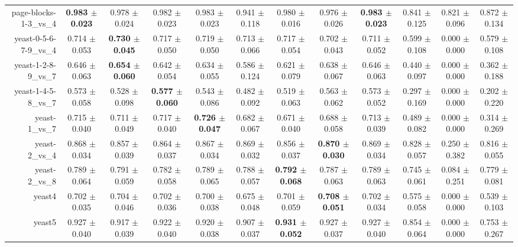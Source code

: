 \begin{table}[!ht]
{\begin{tabular}{r c c c c c c c c c c c}
page-blocks-1-3\_vs\_4 & \textbf{0.983 $\pm$ 0.023} & 0.978 $\pm$ 0.024 & 0.982 $\pm$ 0.023 & 0.983 $\pm$ 0.023 & 0.941 $\pm$ 0.118 & 0.980 $\pm$ 0.016 & 0.976 $\pm$ 0.026 & \textbf{0.983 $\pm$ 0.023} & 0.841 $\pm$ 0.125 & 0.821 $\pm$ 0.096 & 0.872 $\pm$ 0.134 \\
yeast-0-5-6-7-9\_vs\_4 & 0.714 $\pm$ 0.053 & \textbf{0.730 $\pm$ 0.045} & 0.717 $\pm$ 0.050 & 0.719 $\pm$ 0.050 & 0.713 $\pm$ 0.066 & 0.717 $\pm$ 0.054 & 0.702 $\pm$ 0.043 & 0.711 $\pm$ 0.052 & 0.599 $\pm$ 0.108 & 0.000 $\pm$ 0.000 & 0.579 $\pm$ 0.108 \\
yeast-1-2-8-9\_vs\_7 & 0.646 $\pm$ 0.063 & \textbf{0.654 $\pm$ 0.060} & 0.642 $\pm$ 0.054 & 0.634 $\pm$ 0.055 & 0.586 $\pm$ 0.124 & 0.621 $\pm$ 0.079 & 0.638 $\pm$ 0.067 & 0.646 $\pm$ 0.063 & 0.440 $\pm$ 0.097 & 0.000 $\pm$ 0.000 & 0.362 $\pm$ 0.188 \\
yeast-1-4-5-8\_vs\_7 & 0.573 $\pm$ 0.058 & 0.528 $\pm$ 0.098 & \textbf{0.577 $\pm$ 0.060} & 0.543 $\pm$ 0.086 & 0.482 $\pm$ 0.092 & 0.519 $\pm$ 0.063 & 0.563 $\pm$ 0.062 & 0.573 $\pm$ 0.052 & 0.297 $\pm$ 0.169 & 0.000 $\pm$ 0.000 & 0.202 $\pm$ 0.220 \\
yeast-1\_vs\_7 & 0.715 $\pm$ 0.040 & 0.711 $\pm$ 0.049 & 0.717 $\pm$ 0.040 & \textbf{0.726 $\pm$ 0.047} & 0.682 $\pm$ 0.067 & 0.671 $\pm$ 0.040 & 0.688 $\pm$ 0.058 & 0.713 $\pm$ 0.039 & 0.489 $\pm$ 0.082 & 0.000 $\pm$ 0.000 & 0.314 $\pm$ 0.269 \\
yeast-2\_vs\_4 & 0.868 $\pm$ 0.034 & 0.857 $\pm$ 0.039 & 0.864 $\pm$ 0.037 & 0.867 $\pm$ 0.034 & 0.869 $\pm$ 0.032 & 0.856 $\pm$ 0.037 & \textbf{0.870 $\pm$ 0.030} & 0.869 $\pm$ 0.034 & 0.828 $\pm$ 0.057 & 0.250 $\pm$ 0.382 & 0.816 $\pm$ 0.055 \\
yeast-2\_vs\_8 & 0.789 $\pm$ 0.064 & 0.791 $\pm$ 0.059 & 0.782 $\pm$ 0.058 & 0.789 $\pm$ 0.065 & 0.788 $\pm$ 0.057 & \textbf{0.792 $\pm$ 0.068} & 0.787 $\pm$ 0.063 & 0.789 $\pm$ 0.063 & 0.745 $\pm$ 0.061 & 0.084 $\pm$ 0.251 & 0.779 $\pm$ 0.081 \\
yeast4 & 0.702 $\pm$ 0.035 & 0.704 $\pm$ 0.046 & 0.702 $\pm$ 0.036 & 0.700 $\pm$ 0.038 & 0.675 $\pm$ 0.048 & 0.701 $\pm$ 0.059 & \textbf{0.708 $\pm$ 0.051} & 0.702 $\pm$ 0.034 & 0.575 $\pm$ 0.058 & 0.000 $\pm$ 0.000 & 0.539 $\pm$ 0.103 \\
yeast5 & 0.927 $\pm$ 0.040 & 0.917 $\pm$ 0.039 & 0.922 $\pm$ 0.040 & 0.920 $\pm$ 0.038 & 0.907 $\pm$ 0.037 & \textbf{0.931 $\pm$ 0.052} & 0.927 $\pm$ 0.037 & 0.927 $\pm$ 0.040 & 0.854 $\pm$ 0.064 & 0.000 $\pm$ 0.000 & 0.753 $\pm$ 0.267 \\

\end{tabular}}
\end{table}
